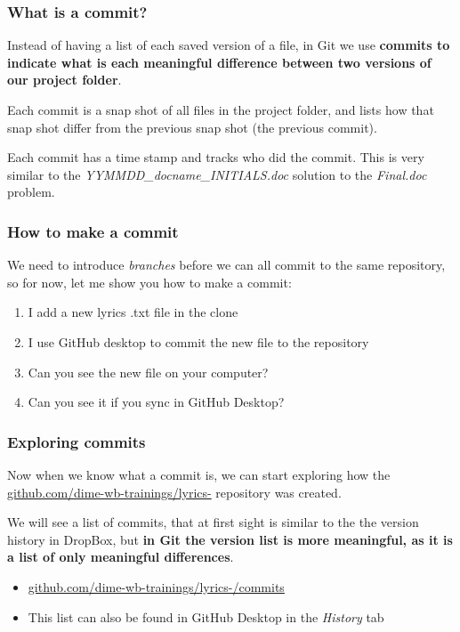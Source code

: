 \documentclass[aspectratio=169]{beamer} %
\newcommand{\trainingURL}[1]{{\color{blue}\url{#1}}}
\newcommand{\traininerUsername}{dime-wb-trainings}
\newcommand{\repoName}{\traininerUsername/lyrics-}
\newcommand{\trainingRepoURL}[1]{\trainingURL{github.com/\repoName #1}}
\begin{document}
\begin{frame}
\frametitle{What is a commit?}

	Instead of having a list of each saved version of a file, in Git we use \textbf{commits to indicate what is each meaningful difference between two versions of our project folder}.

	\vspace{.25cm}

	Each commit is a snap shot of all files in the project folder, and lists how that snap shot differ from the previous snap shot (the previous commit).

	\vspace{.25cm}

	Each commit has a time stamp and tracks who did the commit. This is very similar to the \textit{YYMMDD\_docname\_INITIALS.doc} solution to the \textit{Final.doc} problem.

\end{frame}

\begin{frame}
\frametitle{How to make a commit}

	We need to introduce \textit{branches} before we can all commit to the same repository, so for now, let me show you how to make a commit:

	\begin{enumerate}
		\item I add a new lyrics .txt file in the clone
		\item I use GitHub desktop to commit the new file to the repository
		\item Can you see the new file on your computer?
		\item Can you see it if you sync in GitHub Desktop?
	\end{enumerate}

\end{frame}


\begin{frame}
\frametitle{Exploring commits}

	Now when we know what a commit is, we can start exploring how the \trainingRepoURL{} repository was created.

	\vspace{.25cm}

	We will see a list of commits, that at first sight is similar to the the version history in DropBox, but \textbf{in Git the version list is more meaningful, as it is a list of only meaningful differences}.

	\vspace{.25cm}

	\begin{itemize}
		\item \trainingRepoURL{/commits}
		\item This list can also be found in GitHub Desktop in the \textit{History} tab
	\end{itemize}

\end{frame}
\end{document}
